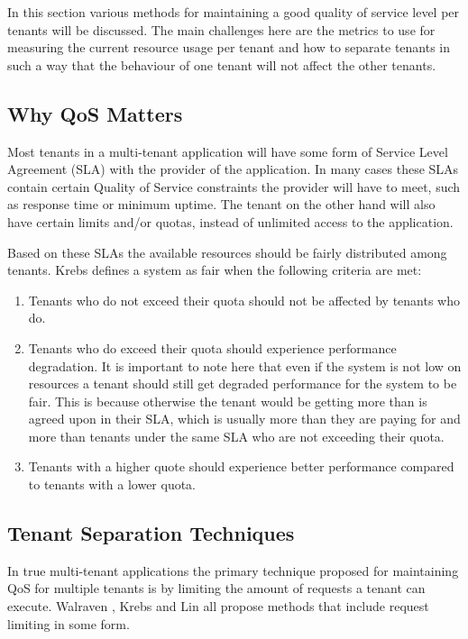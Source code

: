 In this section various methods for maintaining a good quality of service level per tenants will be discussed.
The main challenges here are the metrics to use for measuring the current resource usage per tenant and how to separate tenants in such a way that the behaviour of one tenant will not affect the other tenants.\cite{krebs2013metrics}

\subsection{Why QoS Matters}
Most tenants in a multi-tenant application will have some form of Service Level Agreement (SLA) with the provider of the application.
In many cases these SLAs contain certain Quality of Service constraints the provider will have to meet, such as response time or minimum uptime. 
The tenant on the other hand will also have certain limits and/or quotas, instead of unlimited access to the application.

Based on these SLAs the available resources should be fairly distributed among tenants.
Krebs\cite{krebs2013metrics} defines a system as fair when the following criteria are met:
\begin{enumerate}
	\item Tenants who do not exceed their quota should not be affected by tenants who do.
	\item Tenants who do exceed their quota should experience performance degradation. 
		It is important to note here that even if the system is not low on resources a tenant should still get degraded performance for the system to be fair.
		This is because otherwise the tenant would be getting more than is agreed upon in their SLA, which is usually more than they are paying for and more than tenants under the same SLA who are not exceeding their quota.
	\item Tenants with a higher quote should experience better performance compared to tenants with a lower quota.
\end{enumerate}

\subsection{Tenant Separation Techniques}
In true multi-tenant applications the primary technique proposed for maintaining QoS for multiple tenants is by limiting the amount of requests a tenant can execute. Walraven \cite{walraven2012towards}, Krebs \cite{krebs2013metrics} and Lin \cite{lin2009feedback} all propose methods that include request limiting in some form.


